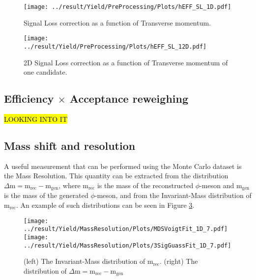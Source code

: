\begin{figure}[!h]
\centering
\texttt{[image: ../result/Yield/PreProcessing/Plots/hEFF\_SL\_1D.pdf]}
\caption{Signal Loss correction as a function of Transverse momentum.}
\label{fig:eff1d}
\end{figure}

\begin{figure}[!h]
\centering
\texttt{[image: ../result/Yield/PreProcessing/Plots/hEFF\_SL\_12D.pdf]}
\caption{2D Signal Loss correction as a function of Transverse momentum of one candidate.}
\label{fig:eff2d}
\end{figure}

\subsection{Efficiency $\times$ Acceptance reweighing}
\hl{LOOKING INTO IT}

\subsection{Mass shift and resolution}
A useful measurement that can be performed using the Monte Carlo dataset is the Mass Resolution. This quantity can be extracted from the distribution $\Delta\text{m} = \text{m}_{\text{rec}} - \text{m}_{\text{gen}}$, where $\text{m}_{\text{rec}}$ is the mass of the reconstructed $\phi$-meson and $\text{m}_{\text{gen}}$ is the mass of the generated $\phi$-meson, and from the Invariant-Mass distribution of $\text{m}_{\text{rec}}$. An example of such distributions can be seen in Figure \ref{fig:InvMassDist}.

\begin{figure}[!h]
\centering
\texttt{[image: ../result/Yield/MassResolution/Plots/MDSVoigtFit\_1D\_7.pdf]}
\texttt{[image: ../result/Yield/MassResolution/Plots/3SigGuassFit\_1D\_7.pdf]}
\label{fig:InvMassDist}
\caption{(left) The Invariant-Mass distribution of $\text{m}_{\text{rec}}$. (right) The distribution of $\Delta\text{m} = \text{m}_{\text{rec}} - \text{m}_{\text{gen}}$ }
\end{figure}

